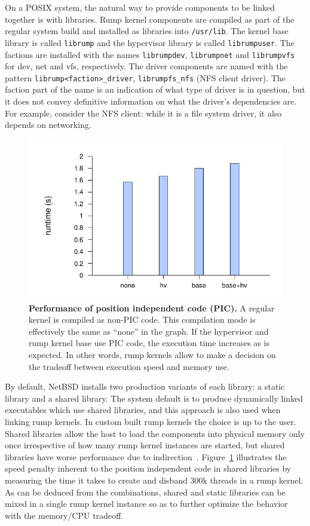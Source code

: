 On a POSIX system, the natural way to provide components to be
linked together is with libraries.  Rump kernel components are compiled
as part of the regular system build and installed as libraries into
\texttt{/usr/lib}.  The kernel base library is called \texttt{librump} and
the hypervisor library is called \texttt{librumpuser}.  The factions
are installed with the names \texttt{librumpdev}, \texttt{librumpnet}
and \texttt{librumpvfs} for dev, net and vfs, respectively.  The
driver components are named with the pattern
\verb+librump<faction>_driver+, \eg \verb+librumpfs_nfs+ (NFS client
driver).  The faction part of the name is an indication of what
type of driver is in question, but it does not convey definitive
information on what the driver's dependencies are.  For example,
consider the NFS client: while it is a file system driver, it
also depends on networking.

\begin{figure}[t]
\includegraphics{sharedstatic}
\caption[Performance of position independent code (PIC)]
{\textbf{Performance of position independent code (PIC).}
A regular kernel is compiled as non-PIC code.  This compilation
mode is effectively the same as ``none'' in the graph.  If the hypervisor
and rump kernel base use PIC code, the execution time increases as
is expected.  In other words, rump kernels allow to make a decision on
the tradeoff between execution speed and memory use.
}
\label{fig:sharedstatic}
\end{figure}

By default, NetBSD installs two production variants of each library:
a static library and a shared library.  The system default is to
produce dynamically linked executables which use shared libraries,
and this approach is also used when linking rump kernels.  In custom
built rump kernels the choice is up to the user.  Shared libraries
allow the host to load the components into physical memory only once
irrespective of how many rump kernel instances are started, but shared libraries have worse
performance due to indirection~\cite{gingell:shlib}.
Figure~\ref{fig:sharedstatic} illustrates the speed penalty inherent
to the position independent code in shared libraries by measuring
the time it takes to create and disband 300k threads in a rump
kernel.  As can be deduced from the combinations, shared
and static libraries can be mixed in a single rump kernel instance
so as to further optimize the behavior with the memory/CPU tradeoff.

